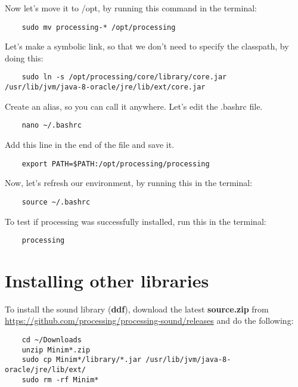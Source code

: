 \documentclass{article}
\begin{document}
Now let's move it to /opt, by running this command in the terminal:

\begin{lstlisting}
	sudo mv processing-* /opt/processing
\end{lstlisting}

Let's make a symbolic link, so that we don't need to specify the classpath, by doing this:

\begin{lstlisting}
	sudo ln -s /opt/processing/core/library/core.jar /usr/lib/jvm/java-8-oracle/jre/lib/ext/core.jar
\end{lstlisting}

Create an alias, so you can call it anywhere. Let's edit the .bashrc file.

\begin{lstlisting}
	nano ~/.bashrc
\end{lstlisting}

\clearpage

Add this line in the end of the file and save it.

\begin{lstlisting}
	export PATH=$PATH:/opt/processing/processing
\end{lstlisting}

Now, let's refresh our environment, by running this in the terminal:

\begin{lstlisting}
	source ~/.bashrc
\end{lstlisting}

To test if processing was successfully installed, run this in the terminal:

\begin{lstlisting}
	processing
\end{lstlisting}

\section{Installing other libraries}

To install the sound library (\textbf{ddf}), download the latest \textbf{source.zip} from \url{https://github.com/processing/processing-sound/releases} and do the following:

\begin{lstlisting}
	cd ~/Downloads
	unzip Minim*.zip
	sudo cp Minim*/library/*.jar /usr/lib/jvm/java-8-oracle/jre/lib/ext/
	sudo rm -rf Minim*
\end{lstlisting}
\end{document}
